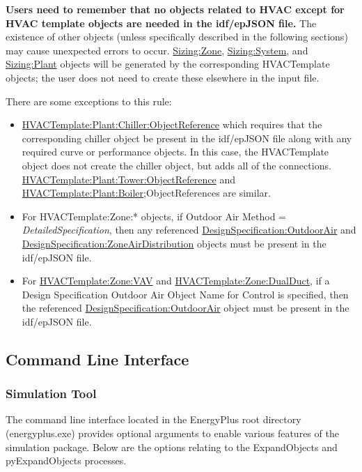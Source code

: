 \textbf{Users need to remember that no objects related to HVAC except for HVAC template objects are needed in the idf/epJSON file.} The existence of other objects (unless specifically described in the following sections) may cause unexpected errors to occur. \hyperref[sizingzone]{Sizing:Zone}, \hyperref[sizingsystem]{Sizing:System}, and \hyperref[sizingplant]{Sizing:Plant} objects will be generated by the corresponding HVACTemplate objects; the user does not need to create these elsewhere in the input file.

There are some exceptions to this rule:

\begin{itemize}
\item
  \hyperref[hvactemplateplantchillerobjectreference]{HVACTemplate:Plant:Chiller:ObjectReference} which requires that the corresponding chiller object be present in the idf/epJSON file along with any required curve or performance objects. In this case, the HVACTemplate object does not create the chiller object, but adds all of the connections. \hyperref[hvactemplateplanttowerobjectreference]{HVACTemplate:Plant:Tower:ObjectReference} and \hyperref[hvactemplateplantboiler]{HVACTemplate:Plant:Boiler};ObjectReferences are similar.
\item
  For HVACTemplate:Zone:* objects, if Outdoor Air Method = \emph{DetailedSpecification}, then any referenced \hyperref[designspecificationoutdoorair]{DesignSpecification:OutdoorAir} and \hyperref[designspecificationzoneairdistribution]{DesignSpecification:ZoneAirDistribution} objects must be present in the idf/epJSON file.
\item
  For \hyperref[hvactemplatezonevav]{HVACTemplate:Zone:VAV} and \hyperref[hvactemplatezonedualduct]{HVACTemplate:Zone:DualDuct}, if a Design Specification Outdoor Air Object Name for Control is specified, then the referenced \hyperref[designspecificationoutdoorair]{DesignSpecification:OutdoorAir} object must be present in the idf/epJSON file.
\end{itemize}

\subsection{Command Line Interface}

\subsubsection{Simulation Tool}

The command line interface located in the EnergyPlus root directory (energyplus.exe) provides optional arguments to enable various features of the simulation package.  Below are the options relating to the ExpandObjects and pyExpandObjects processes.


